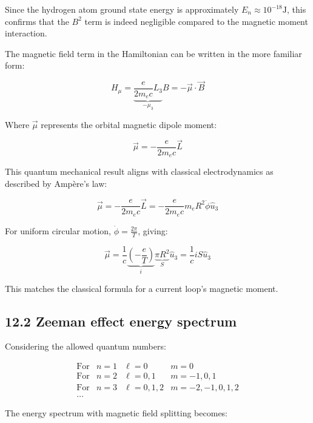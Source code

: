 \documentclass[10pt]{article}
\begin{document}
Since the hydrogen atom ground state energy is approximately $E_n \approx 10^{-18} \text{J}$, this confirms that the $B^2$ term is indeed negligible compared to the magnetic moment interaction.

The magnetic field term in the Hamiltonian can be written in the more familiar form:

\begin{equation*}
H_{\mu}=\underbrace{\frac{e}{2m_e c}L_3}_{-\mu_3}B=-\vec{\mu}\cdot\vec{B} \tag{12.22}
\end{equation*}

Where $\vec{\mu}$ represents the orbital magnetic dipole moment:

\begin{equation*}
\vec{\mu}=-\frac{e}{2m_e c}\vec{L} \tag{12.23}
\end{equation*}

This quantum mechanical result aligns with classical electrodynamics as described by Ampère's law:

\begin{equation*}
\vec{\mu}=-\frac{e}{2m_e c}\vec{L}=-\frac{e}{2m_e c}m_e R^2\dot{\phi}\hat{u}_3 \tag{12.24}
\end{equation*}

For uniform circular motion, $\dot{\phi}=\frac{2\pi}{T}$, giving:

\begin{equation*}
\vec{\mu}=\frac{1}{c}\underbrace{\left(-\frac{e}{T}\right)}_i \underbrace{\pi R^2}_S \hat{u}_3=\frac{1}{c}iS\hat{u}_3 \tag{12.25}
\end{equation*}

This matches the classical formula for a current loop's magnetic moment.

\subsection*{12.2 Zeeman effect energy spectrum}
Considering the allowed quantum numbers:

$$
\begin{array}{llll}
\text{For} & n=1 & \ell=0 & m=0 \\
\text{For} & n=2 & \ell=0,1 & m=-1,0,1 \\
\text{For} & n=3 & \ell=0,1,2 & m=-2,-1,0,1,2 \\
\ldots & & &
\end{array}
$$

The energy spectrum with magnetic field splitting becomes:
\end{document}
